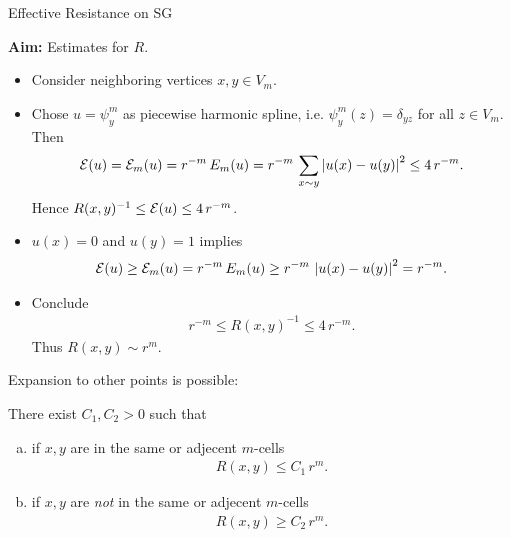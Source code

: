 \begin{frame}[allowframebreaks]{Effective Resistance on SG}

    \textbf{Aim:} Estimates for $R$.

    \begin{itemize}
        \item Consider neighboring vertices $x,y \in V_{m}$.

        \item Chose $u=\psi^{m}_{y}$ as piecewise harmonic spline, i.e. $\psi^{m}_{y}(z) = \delta_{yz}$ for all $z\in V_{m}$. Then
        \begin{align*}
            \mathcal{E}(u) = \mathcal{E}_{m}(u) = r^{-m}\, E_{m}(u) = r^{-m}\, \sum_{x\sim y} \left\vert u(x) - u(y) \right\vert^{2} \leq 4\,r^{-m}.
        \end{align*}
        Hence $R(x,y)^{-1} \leq \mathcal{E}(u) \leq 4\,r^{-m}$.
        
        \item $u(x)=0$ and $u(y)=1$ implies
        \begin{align*}
        \mathcal{E}(u) \geq \mathcal{E}_{m}(u) = r^{-m}\, E_{m}(u) \geq r^{-m}\, \left\vert u(x) - u(y) \right\vert^{2} = r^{-m}.
        \end{align*}
        \item Conclude
        \begin{align*}
            r^{-m}\leq R(x,y)^{-1} \leq 4\, r^{-m}.
        \end{align*}
        Thus $R(x,y) \sim r^{m}$.
    \end{itemize}
    \newpage
    
    Expansion to other points is possible:
    \begin{theorem}
        There exist $C_{1}, C_{2} > 0$ such that
        \begin{enumerate}[(a)]
            \item if $x,y$ are in the same or adjecent $m$-cells
            \begin{align*}
                R(x,y) \leq C_{1}\,r^{m}.
            \end{align*}
            \item if $x,y$ are \emph{not} in the same or adjecent $m$-cells
            \begin{align*}
                R(x,y) \geq C_{2}\,r^{m}.
            \end{align*}
        \end{enumerate}
    \end{theorem}
    \newpage


\end{frame}
